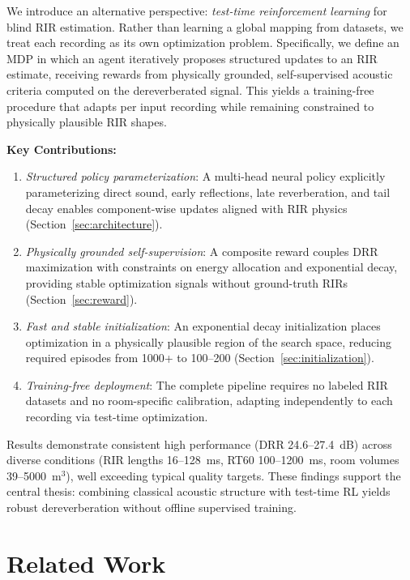 \documentclass[12pt,a4paper]{article}
\begin{document}
We introduce an alternative perspective: \textit{test-time reinforcement learning} for blind RIR estimation. Rather than learning a global mapping from datasets, we treat each recording as its own optimization problem. Specifically, we define an MDP in which an agent iteratively proposes structured updates to an RIR estimate, receiving rewards from physically grounded, self-supervised acoustic criteria computed on the dereverberated signal. This yields a training-free procedure that adapts per input recording while remaining constrained to physically plausible RIR shapes.

\textbf{Key Contributions:}
\begin{enumerate}
\item \textit{Structured policy parameterization}: A multi-head neural policy explicitly parameterizing direct sound, early reflections, late reverberation, and tail decay enables component-wise updates aligned with RIR physics (Section~\ref{sec:architecture}).
\item \textit{Physically grounded self-supervision}: A composite reward couples DRR maximization with constraints on energy allocation and exponential decay, providing stable optimization signals without ground-truth RIRs (Section~\ref{sec:reward}).
\item \textit{Fast and stable initialization}: An exponential decay initialization places optimization in a physically plausible region of the search space, reducing required episodes from 1000+ to 100--200 (Section~\ref{sec:initialization}).
\item \textit{Training-free deployment}: The complete pipeline requires no labeled RIR datasets and no room-specific calibration, adapting independently to each recording via test-time optimization.
\end{enumerate}

Results demonstrate consistent high performance (DRR 24.6--27.4~dB) across diverse conditions (RIR lengths 16--128~ms, RT60 100--1200~ms, room volumes 39--5000~m$^3$), well exceeding typical quality targets. These findings support the central thesis: combining classical acoustic structure with test-time RL yields robust dereverberation without offline supervised training.

\section{Related Work}
\end{document}
